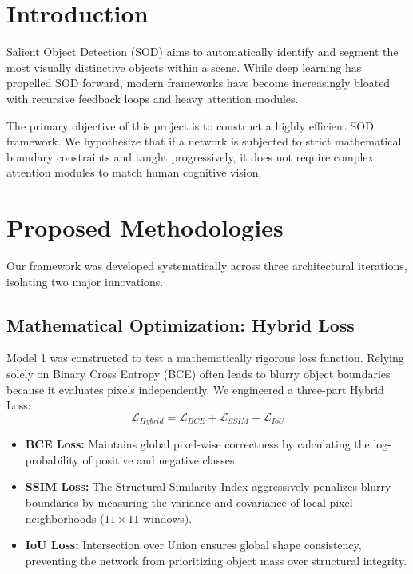 \documentclass[10pt,conference,twocolumn]{IEEEtran}
\begin{document}
\section{Introduction}
Salient Object Detection (SOD) aims to automatically identify and segment the most visually distinctive objects within a scene. While deep learning has propelled SOD forward, modern frameworks have become increasingly bloated with recursive feedback loops and heavy attention modules. 

The primary objective of this project is to construct a highly efficient SOD framework. We hypothesize that if a network is subjected to strict mathematical boundary constraints and taught progressively, it does not require complex attention modules to match human cognitive vision. 

\section{Proposed Methodologies}
Our framework was developed systematically across three architectural iterations, isolating two major innovations.

\subsection{Mathematical Optimization: Hybrid Loss}
Model 1 was constructed to test a mathematically rigorous loss function. Relying solely on Binary Cross Entropy (BCE) often leads to blurry object boundaries because it evaluates pixels independently. We engineered a three-part Hybrid Loss:
\begin{equation}
    \mathcal{L}_{Hybrid} = \mathcal{L}_{BCE} + \mathcal{L}_{SSIM} + \mathcal{L}_{IoU}
\end{equation}

\begin{itemize}
    \item \textbf{BCE Loss:} Maintains global pixel-wise correctness by calculating the log-probability of positive and negative classes.
    \item \textbf{SSIM Loss:} The Structural Similarity Index aggressively penalizes blurry boundaries by measuring the variance and covariance of local pixel neighborhoods ($11\times11$ windows).
    \item \textbf{IoU Loss:} Intersection over Union ensures global shape consistency, preventing the network from prioritizing object mass over structural integrity.
\end{itemize}
\end{document}
